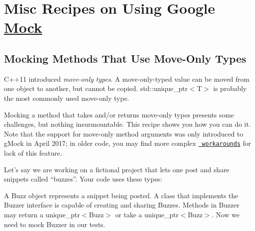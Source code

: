 \section*{Misc Recipes on Using Google \mbox{\hyperlink{class_mock}{Mock}}}

\subsection*{Mocking Methods That Use Move-\/\+Only Types}

C++11 introduced {\itshape move-\/only types}. A move-\/only-\/typed value can be moved from one object to another, but cannot be copied. {\ttfamily std\+::unique\+\_\+ptr$<$T$>$} is probably the most commonly used move-\/only type.

Mocking a method that takes and/or returns move-\/only types presents some challenges, but nothing insurmountable. This recipe shows you how you can do it. Note that the support for move-\/only method arguments was only introduced to g\+Mock in April 2017; in older code, you may find more complex \href{\#LegacyMoveOnly}{\texttt{ workarounds}} for lack of this feature.

Let’s say we are working on a fictional project that lets one post and share snippets called “buzzes”. Your code uses these types\+:


\begin{DoxyCode}{0}
\DoxyCodeLine{}
\DoxyCodeLine{ \textcolor{keyword}{public}:}
\DoxyCodeLine{\};}
\DoxyCodeLine{}
\DoxyCodeLine{ \textcolor{keyword}{public}:}
\DoxyCodeLine{\};}
\end{DoxyCode}


A {\ttfamily Buzz} object represents a snippet being posted. A class that implements the {\ttfamily Buzzer} interface is capable of creating and sharing {\ttfamily Buzz}es. Methods in {\ttfamily Buzzer} may return a {\ttfamily unique\+\_\+ptr$<$Buzz$>$} or take a {\ttfamily unique\+\_\+ptr$<$Buzz$>$}. Now we need to mock {\ttfamily Buzzer} in our tests.

